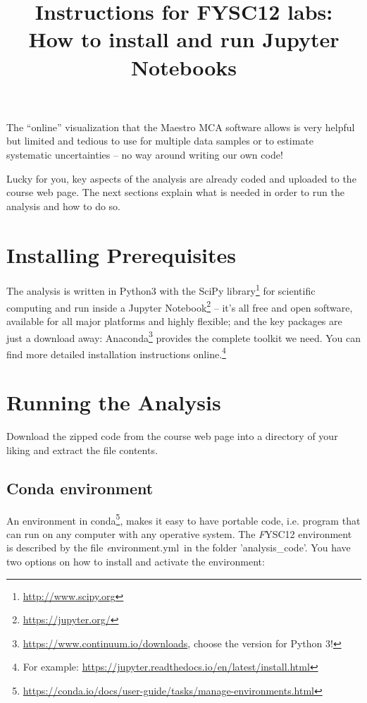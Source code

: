 \documentclass[a4,11pt, notitlepage]{article}
\begin{document}
\title{Instructions for FYSC12 labs:\\ How to install and run Jupyter Notebooks}
\date{}
\maketitle

\vspace{-1cm}

The ``online'' visualization that the Maestro MCA software allows is
very helpful but limited and tedious to use for multiple data samples
or to estimate systematic uncertainties
-- no way around writing our own code!

Lucky for you, key aspects of the analysis are already coded and
uploaded to the course web page. The next
sections explain what is needed in order to run the analysis and how
to do so.

\section{Installing Prerequisites}
\label{sec:prerequisites}

The analysis is written in Python3 with the SciPy
library\footnote{\url{http://www.scipy.org}} for scientific computing and run
inside a Jupyter Notebook\footnote{\url{https://jupyter.org/}} -- it's all
  free and open software, available for all major platforms and
  highly flexible; and the key packages are just a download away:
  Anaconda\footnote{\url{https://www.continuum.io/downloads}, choose the version
    for Python 3!} provides the complete toolkit we need.
  You can find more detailed installation instructions online.\footnote{For
  example: \url{https://jupyter.readthedocs.io/en/latest/install.html}}


\section{Running the Analysis}
\label{sec:running-analysis}
Download the zipped code from the course web page into a directory
of your liking and extract the file contents.

\subsection*{Conda environment}
An environment in conda\footnote{\url{https://conda.io/docs/user-guide/tasks/manage-environments.html}}, makes it easy to have portable code, i.e. program that can run on any computer with any operative system.
The {\emph FYSC12} environment is described by the file {\emph environment.yml} in the folder 'analysis\_code'.
You have two options on how to install and activate the environment:
\end{document}
